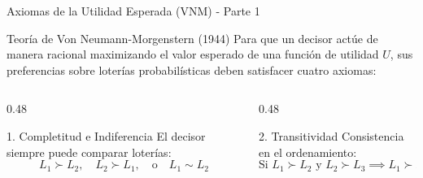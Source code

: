 \documentclass[aspectratio=169, 10pt]{beamer}
\begin{document}
\begin{frame}{Axiomas de la Utilidad Esperada (VNM) - Parte 1}
    \begin{block}{Teoría de Von Neumann-Morgenstern (1944)}
        Para que un decisor actúe de manera racional maximizando el valor esperado de una función de utilidad $U$, sus preferencias sobre loterías probabilísticas deben satisfacer cuatro axiomas:
    \end{block}
    \begin{columns}[T]
        \begin{column}{0.48\textwidth}
            \begin{exampleblock}{1. Completitud e Indiferencia}
                El decisor siempre puede comparar loterías:
                \begin{equation*}
                    L_1 \succ L_2, \quad L_2 \succ L_1, \quad \text{o} \quad L_1 \sim L_2
                \end{equation*}
            \end{exampleblock}
        \end{column}
        
        \begin{column}{0.48\textwidth}
            \begin{exampleblock}{2. Transitividad}
                Consistencia en el ordenamiento:
                \begin{equation*}
                    \text{Si } L_1 \succ L_2 \text{ y } L_2 \succ L_3 \implies L_1 \succ L_3
                \end{equation*}
            \end{exampleblock}
        \end{column}
    \end{columns}
\end{frame}
\end{document}

